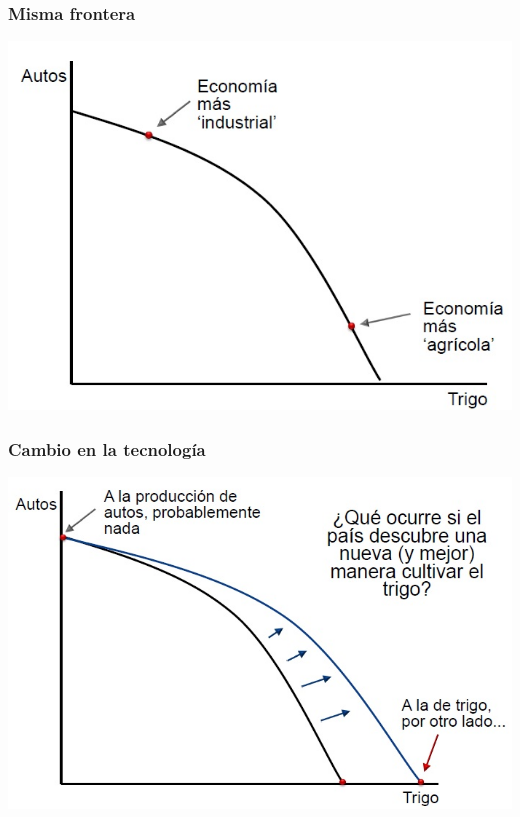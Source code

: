 \documentclass{beamer}
\begin{document}
\begin{frame}
\frametitle{Misma frontera}
\begin{center}
    \includegraphics[scale=0.6]{Tema_11.6_lamismafrontera.jpg}
\end{center}
\end{frame}

\begin{frame}
\frametitle{Cambio en la tecnología}
\begin{center}
    \includegraphics[scale=0.6]{Tema_11.7_cambiotecnologico.jpg}
\end{center}
\end{frame}
\end{document}
